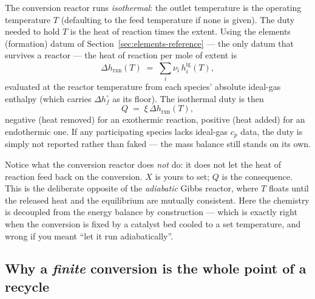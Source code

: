 \documentclass[11pt,a4paper]{article}
\begin{document}
The conversion reactor runs \emph{isothermal}: the outlet temperature
is the operating temperature $T$ (defaulting to the feed temperature if
none is given). The duty needed to hold $T$ is the heat of reaction
times the extent. Using the elements (formation) datum of
Section~\ref{sec:elements-reference} --- the only datum that survives a
reactor --- the heat of reaction per mole of extent is
\begin{equation}
   \Delta h_{\mathrm{rxn}}(T) \;=\; \sum_i \nu_i\, h_i^{\mathrm{ig}}(T),
   \label{eq:conv-dhrxn}
\end{equation}
evaluated at the reactor temperature from each species' absolute
ideal-gas enthalpy  (which carries
$\Delta h^{\circ}_f$ as its floor). The isothermal duty is then
\begin{equation}
   Q \;=\; \xi\,\Delta h_{\mathrm{rxn}}(T),
   \label{eq:conv-duty}
\end{equation}
negative (heat removed) for an exothermic reaction, positive (heat
added) for an endothermic one. If any participating species lacks
ideal-gas $c_p$ data, the duty is simply not reported rather than
faked --- the mass balance still stands on its own.

\begin{intuition}
Notice what the conversion reactor does \emph{not} do: it does not let
the heat of reaction feed back on the conversion. $X$ is yours to set;
$Q$ is the consequence. This is the deliberate opposite of the
\emph{adiabatic} Gibbs reactor, where $T$ floats until the released
heat and the equilibrium are mutually consistent. Here the chemistry is
decoupled from the energy balance by construction --- which is exactly
right when the conversion is fixed by a catalyst bed cooled to a set
temperature, and wrong if you meant ``let it run adiabatically''.
\end{intuition}

\subsection{Why a \emph{finite} conversion is the whole point of a recycle}
\label{sec:conv-recycle}
\end{document}
